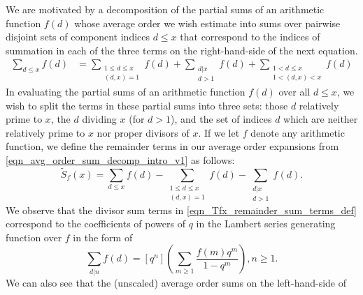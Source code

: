 \documentclass[12pt,reqno,a4letter]{article}
\numberwithin{figure}{section}
\numberwithin{table}{section}
\numberwithin{equation}{section}
\theoremstyle{plain}
\numberwithin{theorem}{section}
\theoremstyle{definition}
\begin{document}
We are motivated by a decomposition of the partial sums of an 
arithmetic function $f(d)$ whose average order we wish estimate into sums over 
pairwise disjoint sets of component indices $d \leq x$ that correspond to the indices 
of summation in each of the three terms on the right-hand-side of the next equation. 
\begin{align} 
\label{eqn_avg_order_sum_decomp_intro_v1} 
\sum_{d \leq x} f(d) & = \sum_{\substack{1 \leq d \leq x \\ (d,x)=1}} f(d) + \sum_{\substack{d|x \\ d>1}} f(d) + 
     \sum_{\substack{1 < d \leq x \\ 1 < (d,x) < x}} f(d) 
\end{align} 
In evaluating the partial sums of an arithmetic function $f(d)$ over all $d \leq x$, we wish 
to split the terms in these partial sums into three sets: those $d$ relatively prime to $x$, the 
$d$ dividing $x$ (for $d > 1$), and the 
set of indices $d$ which are neither relatively prime to $x$ nor proper divisors of $x$. 
If we let $f$ denote any arithmetic function, we define the remainder terms in our average order 
expansions from \eqref{eqn_avg_order_sum_decomp_intro_v1} as follows: 
\begin{equation} 
\label{eqn_Tfx_remainder_sum_terms_def} 
\widetilde{S}_{f}(x) = \sum_{d \leq x} f(d) - 
     \sum_{\substack{1 \leq d \leq x \\ (d,x)=1}} f(d) - \sum_{\substack{d|x \\ d > 1}} f(d). 
\end{equation} 
We observe that the divisor sum terms in \eqref{eqn_Tfx_remainder_sum_terms_def} correspond to the 
coefficients of powers of $q$ in the Lambert series generating function over $f$ in the form of 
\[
\sum_{d|n} f(d) = [q^n] \left(\sum_{m \geq 1} \frac{f(m) q^m}{1-q^m}\right), n \geq 1. 
\] 
We can also see that the (unscaled) average order sums on the left-hand-side of 
\end{document}
